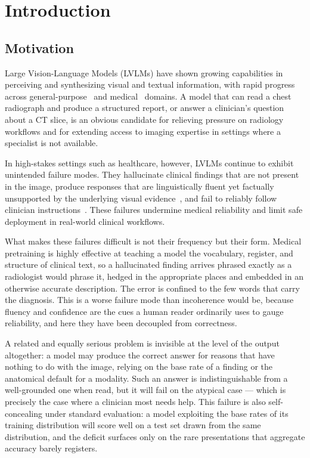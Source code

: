 \section{Introduction}
\label{section:introduction}

\subsection{Motivation}
\label{sec:intro:motivation}

Large Vision-Language Models (LVLMs) have shown growing capabilities in perceiving and synthesizing visual and textual information, with rapid progress across general-purpose~\cite{bai2025qwen3, achiam2023gpt, singh2025openai, liu2024deepseek} and medical~\cite{li2024llavamed, chen2024chexagent, chen2024towards, sellergren2025medgemma, alsaad2024multimodal, saab2024capabilities} domains. A model that can read a chest radiograph and produce a structured report, or answer a clinician's question about a CT slice, is an obvious candidate for relieving pressure on radiology workflows and for extending access to imaging expertise in settings where a specialist is not available.

In high-stakes settings such as healthcare, however, LVLMs continue to exhibit unintended failure modes. They hallucinate clinical findings that are not present in the image, produce responses that are linguistically fluent yet factually unsupported by the underlying visual evidence~\cite{zhang2024medihall, seth2025hallucinogen}, and fail to reliably follow clinician instructions~\cite{vadlapati2026ai, xia2024cares}. These failures undermine medical reliability and limit safe deployment in real-world clinical workflows.

What makes these failures difficult is not their frequency but their form. Medical pretraining is highly effective at teaching a model the vocabulary, register, and structure of clinical text, so a hallucinated finding arrives phrased exactly as a radiologist would phrase it, hedged in the appropriate places and embedded in an otherwise accurate description. The error is confined to the few words that carry the diagnosis. This is a worse failure mode than incoherence would be, because fluency and confidence are the cues a human reader ordinarily uses to gauge reliability, and here they have been decoupled from correctness.

A related and equally serious problem is invisible at the level of the output altogether: a model may produce the correct answer for reasons that have nothing to do with the image, relying on the base rate of a finding or the anatomical default for a modality. Such an answer is indistinguishable from a well-grounded one when read, but it will fail on the atypical case --- which is precisely the case where a clinician most needs help. This failure is also self-concealing under standard evaluation: a model exploiting the base rates of its training distribution will score well on a test set drawn from the same distribution, and the deficit surfaces only on the rare presentations that aggregate accuracy barely registers.

